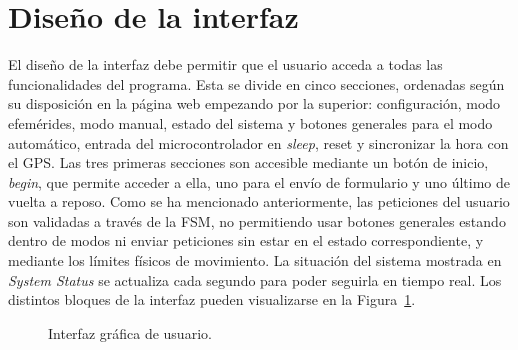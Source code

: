 \FloatBarrier


\section{Diseño de la interfaz}

El diseño de la interfaz debe permitir que el usuario acceda a todas las funcionalidades del programa. Esta se divide en cinco secciones, ordenadas según su disposición en la página web empezando por la superior: configuración, modo efemérides, modo manual, estado del sistema y botones generales para el modo automático, entrada del microcontrolador en \textit{sleep}, reset y sincronizar la hora con el GPS. Las tres primeras secciones son accesible mediante un botón de inicio, \textit{begin}, que permite acceder a ella, uno para el envío de formulario y uno último de vuelta a reposo. Como se ha mencionado anteriormente, las peticiones del usuario son validadas a través de la FSM, no permitiendo usar botones generales estando dentro de modos ni enviar peticiones sin estar en el estado correspondiente, y mediante los límites físicos de movimiento. La situación del sistema mostrada en \textit{System Status} se actualiza cada segundo para poder seguirla en tiempo real. Los distintos bloques de la interfaz pueden visualizarse en la Figura~\ref{fig:interfaz}.
\begin{figure}[t]
	\centering
	\subfloat[Configuración.]
	{	
				
	}
	\subfloat[Estado.]
	{
				
	}
	
	
	\subfloat[Botones.]
	{
		
	}	

	
	\caption{Interfaz gráfica de usuario.}
	\label{fig:interfaz}
\end{figure}


